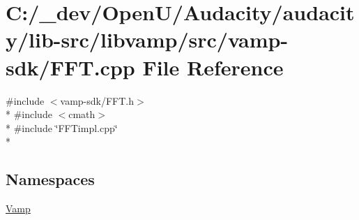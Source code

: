 \hypertarget{lib-src_2libvamp_2src_2vamp-sdk_2_f_f_t_8cpp}{}\section{C\+:/\+\_\+dev/\+Open\+U/\+Audacity/audacity/lib-\/src/libvamp/src/vamp-\/sdk/\+F\+FT.cpp File Reference}
\label{lib-src_2libvamp_2src_2vamp-sdk_2_f_f_t_8cpp}
{\ttfamily \#include $<$vamp-\/sdk/\+F\+F\+T.\+h$>$}\\*
{\ttfamily \#include $<$cmath$>$}\\*
{\ttfamily \#include \char`\"{}F\+F\+Timpl.\+cpp\char`\"{}}\\*
\subsection*{Namespaces}
\begin{DoxyCompactItemize}
\item 
 \hyperlink{namespace_vamp}{Vamp}
\end{DoxyCompactItemize}
